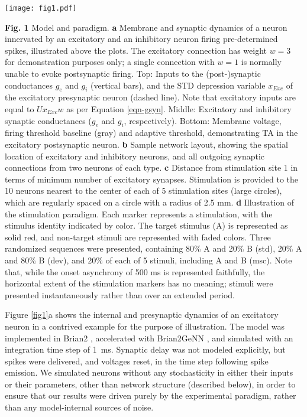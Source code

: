 \documentclass[pdflatex,referee,iicol,sn-basic]{sn-jnl}
\theoremstyle{thmstyleone}%
\theoremstyle{thmstyletwo}%
\theoremstyle{thmstylethree}%
\begin{document}
\begin{figure*}%
    \centering
    \texttt{[image: fig1.pdf]}
    \caption{}
    \label{fig1}
\end{figure*}
\textbf{Fig. 1} Model and paradigm. \textbf{a} Membrane and synaptic dynamics of a neuron innervated by an excitatory and an inhibitory neuron firing pre-determined spikes, illustrated above the plots. The excitatory connection has weight $w = 3$ for demonstration purposes only; a single connection with $w = 1$ is normally unable to evoke postsynaptic firing. Top: Inputs to the (post-)synaptic conductances $g_e$ and $g_i$ (vertical bars), and the STD depression variable $x_{Exc}$ of the excitatory presynaptic neuron (dashed line). Note that excitatory inputs are equal to $U x_{Exc} w$ as per Equation \ref{eqn-gsyn}. Middle: Excitatory and inhibitory synaptic conductances ($g_e$ and $g_i$, respectively). Bottom: Membrane voltage, firing threshold baseline (gray) and adaptive threshold, demonstrating TA in the excitatory postsynaptic neuron. \textbf{b} Sample network layout, showing the spatial location of excitatory and inhibitory neurons, and all outgoing synaptic connections from two neurons of each type. \textbf{c} Distance from stimulation site 1 in terms of minimum number of excitatory synapses. Stimulation is provided to the 10 neurons nearest to the center of each of 5 stimulation sites (large circles), which are regularly spaced on a circle with a radius of 2.5 mm. \textbf{d} Illustration of the stimulation paradigm. Each marker represents a stimulation, with the stimulus identity indicated by color. The target stimulus (A) is represented as solid red, and non-target stimuli are represented with faded colors. Three randomized sequences were presented, containing 80\% A and 20\% B (std), 20\% A and 80\% B (dev), and 20\% of each of 5 stimuli, including A and B (msc). Note that, while the onset asynchrony of 500 ms is represented faithfully, the horizontal extent of the stimulation markers has no meaning; stimuli were presented instantaneously rather than over an extended period.

Figure \ref{fig1}a shows the internal and presynaptic dynamics of an excitatory neuron in a contrived example for the purpose of illustration. The model was implemented in Brian2 \citep{Stimberg2019-tc}, accelerated with Brian2GeNN \citep{Stimberg2020-go}, and simulated with an integration time step of 1~ms. Synaptic delay was not modeled explicitly, but spikes were delivered, and voltages reset, in the time step following spike emission. We simulated neurons without any stochasticity in either their inputs or their parameters, other than network structure (described below), in order to ensure that our results were driven purely by the experimental paradigm, rather than any model-internal sources of noise.
\end{document}

